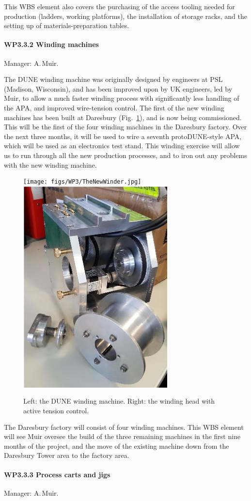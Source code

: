 This WBS element also covers the purchasing of the access tooling needed for production (ladders, working platforms), the installation of storage racks, and the setting up of materials-preparation tables.


\paragraph{WP3.3.2 Winding machines} Manager: A.\,Muir.

The DUNE winding machine was originally designed by engineers at PSL (Madison, Wisconsin), and has been improved upon by UK engineers, led by Muir, to allow a much faster winding process with significantly less handling of the APA, and improved wire-tension control. The first of the new winding machines has been built at Daresbury (Fig.~\ref{fig:WindingMachine}), and is now being commissioned. This will be the first of the four winding machines in the Daresbury factory. Over the next three months, it will be used to wire a seventh protoDUNE-style APA, which will be used as an electronics test stand. This winding exercise will allow us to run through all the new production processes, and to iron out any problems with the new winding machine.

\begin{figure}
    \centering
    \texttt{[image: figs/WP3/TheNewWinder.jpg]}
    \includegraphics[height=0.3\textwidth]{figs/WP3/ActiveTensionHead.png}
    \caption{Left: the DUNE winding machine. Right: the winding head with active tension control.}
    \label{fig:WindingMachine}
\end{figure}

The Daresbury factory will consist of four winding machines. This WBS element will see Muir oversee the build of the three remaining machines in the first nine months of the project, and the move of the existing machine down from the Daresbury Tower area to the factory area.

\paragraph{WP3.3.3 Process carts and jigs} Manager: A.\,Muir.

